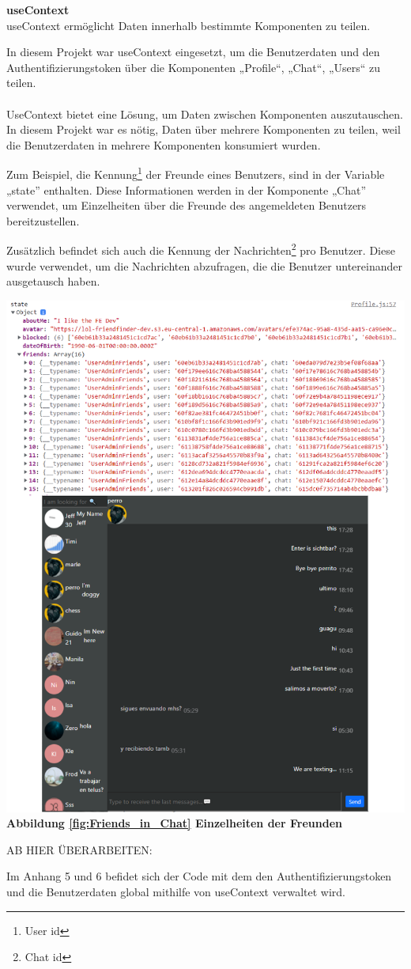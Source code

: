 \textbf{useContext}
\\
useContext ermöglicht Daten innerhalb bestimmte Komponenten zu teilen.

In diesem Projekt war useContext eingesetzt, um die Benutzerdaten und den Authentifizierungstoken über die Komponenten  „Profile“, „Chat“, „Users“ zu teilen.
\\\\
UseContext bietet eine Lösung, um Daten zwischen Komponenten auszutauschen.{\cite{R04}}
\\
In diesem Projekt war es nötig, Daten über mehrere Komponenten zu teilen, weil die Benutzerdaten in mehrere Komponenten konsumiert wurden.

\newpage
Zum Beispiel, die Kennung\footnote{User id} der Freunde eines Benutzers, sind in der Variable „state” enthalten. Diese Informationen werden in der Komponente „Chat” verwendet, um Einzelheiten über die Freunde des angemeldeten Benutzers bereitzustellen. 
 
Zusätzlich befindet sich auch die Kennung der Nachrichten\footnote{Chat id} pro Benutzer. Diese wurde verwendet, um die Nachrichten abzufragen, die die Benutzer untereinander ausgetausch haben.
\begin{center}
  \includegraphics[scale=0.55]
  {sources/Friends_in_Chat}\label{fig:Friends_in_Chat}\\
  \textbf{Abbildung \autoref{fig:Friends_in_Chat}
  Einzelheiten der Freunden}
\end{center}
AB HIER ÜBERARBEITEN:

Im Anhang 5 und 6 befidet sich der Code mit dem den Authentifizierungstoken und die Benutzerdaten global  mithilfe von useContext verwaltet wird.


